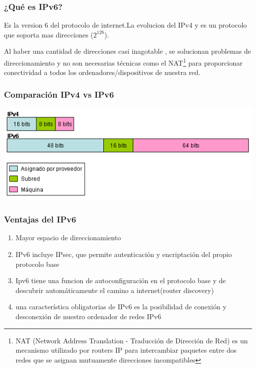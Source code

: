 \documentclass{beamer}
\begin{document}
\begin{frame}
\frametitle{¿Qué es IPv6?}

Es la version 6 del protocolo de internet.La evolucion del IPv4 y es un protocolo que soporta mas direcciones ($2^{128}$).
\par Al haber una cantidad de direcciones casi inagotable , se solucionan problemas de direccionamiento y no son necesarias técnicas como el NAT\footnote[1]{NAT (Network Address Translation - Traducción de Dirección de Red) es un mecanismo utilizado por routers IP para intercambiar paquetes entre dos redes que se asignan mutuamente direcciones incompatibles} para proporcionar conectividad a todos los ordenadores/dispositivos de nuestra red.

\end{frame}

\begin{frame}
\frametitle{Comparación IPv4 vs IPv6}

\includegraphics[scale=0.87]{estructura_direccion.png}

\end{frame}


\begin{frame}
\frametitle{Ventajas del IPv6}

\begin{enumerate}[$*$]

	\item Mayor espacio de direccionamiento
	\item IPv6  incluye IPsec, que permite autenticación y encriptación del propio protocolo base
	\item Ipv6 tiene una funcion de autoconfiguración en el protocolo base y de descubrir automáticamente el camino a internet(router discovery)
	\item una característica obligatorias de IPv6 es la posibilidad de conexión y desconexión de nuestro ordenador de redes IPv6
\end{enumerate}
\end{frame}
\end{document}
